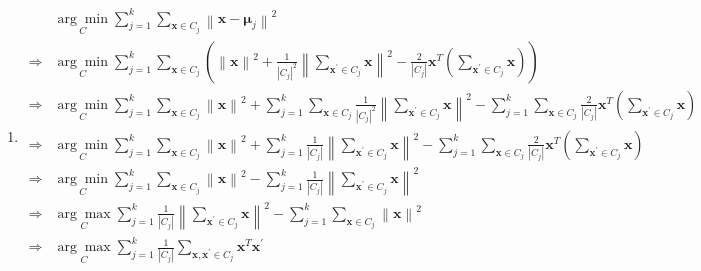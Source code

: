 \documentclass[a4paper]{article}
\begin{document}
\begin{enumerate}
\begin{enumerate}
\begin{enumerate}
    
    \item
    \begin{equation*}
      \begin{aligned}
        &\underset{C}{\arg \min } \sum_{j=1}^{k} \sum_{\boldsymbol{x} \in C_{j}}\left\|\boldsymbol{x}-\boldsymbol{\mu}_{j}\right\|^{2}\\
        \Rightarrow & \underset{C}{\arg \min } \sum_{j=1}^{k} \sum_{\boldsymbol{x} \in C_{j}} (\left\|\boldsymbol{x}\right\|^{2} + \frac{1}{\left|C_{j}\right|^{2}}\left\|\sum_{\boldsymbol{x^{'}} \in C_{j}} \boldsymbol{x}\right\|^{2} - \frac{2}{\left|C_{j}\right|} \boldsymbol{x}^{T} (\sum_{\boldsymbol{x^{'}} \in C_{j}} \boldsymbol{x}))\\
        \Rightarrow & \underset{C}{\arg \min } \sum_{j=1}^{k} \sum_{\boldsymbol{x} \in C_{j}}\left\|\boldsymbol{x}\right\|^{2} + \sum_{j=1}^{k} \sum_{\boldsymbol{x} \in C_{j}}\frac{1}{\left|C_{j}\right|^{2}}\left\|\sum_{\boldsymbol{x^{'}} \in C_{j}} \boldsymbol{x}\right\|^{2} - \sum_{j=1}^{k} \sum_{\boldsymbol{x} \in C_{j}}\frac{2}{\left|C_{j}\right|} \boldsymbol{x}^{T} (\sum_{\boldsymbol{x^{'}} \in C_{j}} \boldsymbol{x})\\
        \Rightarrow & \underset{C}{\arg \min } \sum_{j=1}^{k} \sum_{\boldsymbol{x} \in C_{j}}\left\|\boldsymbol{x}\right\|^{2} + \sum_{j=1}^{k} \frac{1}{\left|C_{j}\right|}\left\|\sum_{\boldsymbol{x^{'}} \in C_{j}} \boldsymbol{x}\right\|^{2} - \sum_{j=1}^{k} \sum_{\boldsymbol{x} \in C_{j}}\frac{2}{\left|C_{j}\right|} \boldsymbol{x}^{T} (\sum_{\boldsymbol{x^{'}} \in C_{j}} \boldsymbol{x})\\
        \Rightarrow & \underset{C}{\arg \min } \sum_{j=1}^{k} \sum_{\boldsymbol{x} \in C_{j}}\left\|\boldsymbol{x}\right\|^{2} - \sum_{j=1}^{k} \frac{1}{\left|C_{j}\right|}\left\|\sum_{\boldsymbol{x^{'}} \in C_{j}} \boldsymbol{x}\right\|^{2}\\
        \Rightarrow & \underset{C}{\arg \max } \sum_{j=1}^{k} \frac{1}{\left|C_{j}\right|}\left\|\sum_{\boldsymbol{x^{'}} \in C_{j}} \boldsymbol{x}\right\|^{2} - \sum_{j=1}^{k} \sum_{\boldsymbol{x} \in C_{j}}\left\|\boldsymbol{x}\right\|^{2}\\
        \Rightarrow & \underset{C}{\arg \max } \sum_{j=1}^{k} \frac{1}{\left|C_{j}\right|} \sum_{\boldsymbol{x}, \boldsymbol{x}^{\prime} \in C_{j}} \boldsymbol{x}^{T} \boldsymbol{x}^{'}\\
      \end{aligned}
    \end{equation*}

  \end{enumerate}
  

\end{enumerate}
\end{enumerate}
\end{document}
